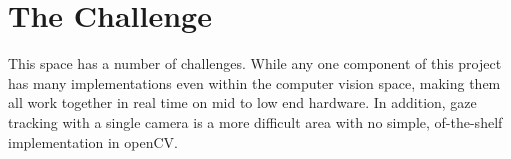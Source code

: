 \section{The Challenge}

This space has a number of challenges. 
While any one component of this project has many implementations even within the computer vision space, making them all work together in real time on mid to low end hardware.
In addition, gaze tracking with a single camera is a more difficult area with no simple, of-the-shelf implementation in openCV.